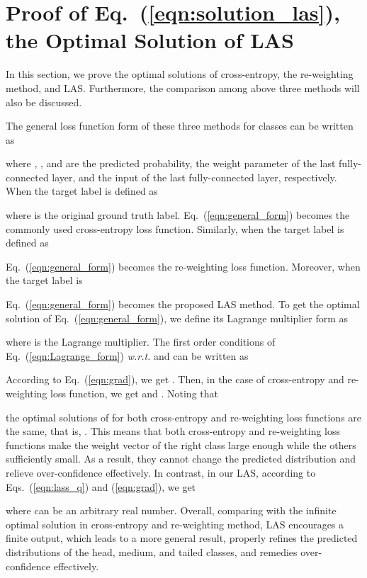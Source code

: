 \documentclass[final]{cvpr}
\begin{document}
	\section{Proof of Eq.~(\ref{eqn:solution_las}), the Optimal Solution of LAS}\label{sec:proof}
	In this section, we prove the optimal solutions of cross-entropy, the re-weighting method, and LAS. Furthermore, the comparison among above three methods will also be discussed.
	
	The general loss function form of these three methods for  classes can be written as
	
	where , , and  are the predicted probability, the weight parameter of the last fully-connected layer, and the input of the last fully-connected layer, respectively. 
	When the target label  is defined as
	
	where  is the original ground truth label. Eq.~(\ref{eqn:general_form}) becomes the commonly used cross-entropy loss function. Similarly, when the target label  is defined as
	
	Eq.~(\ref{eqn:general_form}) becomes the re-weighting loss function. Moreover, 	when the target label  is
	
	Eq.~(\ref{eqn:general_form}) becomes the proposed LAS method. To get the optimal solution of Eq.~(\ref{eqn:general_form}), we define its Lagrange multiplier form as
	
	where  is the Lagrange multiplier. The first order conditions of Eq.~(\ref{eqn:Lagrange_form}) \textit{w.r.t.}   and  can be written as
	
	According to Eq.~(\ref{eqn:grad}), we get . Then, in the case of cross-entropy and re-weighting loss function, we get  and . Noting that 
	
	the optimal solutions of  for both cross-entropy and re-weighting loss functions are the same, that is, . This means that both cross-entropy and re-weighting loss functions make the weight vector of the right class  large enough while the others  sufficiently small. As a result, they cannot change the predicted distribution and relieve over-confidence effectively. In contrast, in our LAS, according to Eqs.~(\ref{eqn:lass_q}) and (\ref{eqn:grad}), we get
	
	where  can be an arbitrary real number. Overall, comparing with the infinite optimal solution in cross-entropy and re-weighting method, LAS encourages a finite output, which leads to a more general result, properly refines the predicted distributions of the head, medium, and tailed classes, and remedies over-confidence effectively.
	
\end{document}
